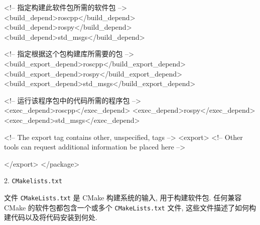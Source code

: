 \documentclass[openany, fontset=windowsold]{ctexbook}
\theoremstyle{kaiti}
\theoremstyle{normal}
\begin{document}
\begin{xml}
    <!-- 指定构建此软件包所需的软件包 -->
    <build_depend>roscpp</build_depend>
    <build_depend>rospy</build_depend>
    <build_depend>std_msgs</build_depend>

    <!-- 指定根据这个包构建库所需要的包 -->
    <build_export_depend>roscpp</build_export_depend>
    <build_export_depend>rospy</build_export_depend>
    <build_export_depend>std_msgs</build_export_depend>

    <!-- 运行该程序包中的代码所需的程序包 -->  
    <exec_depend>roscpp</exec_depend>
    <exec_depend>rospy</exec_depend>
    <exec_depend>std_msgs</exec_depend>


    <!-- The export tag contains other, unspecified, tags -->
    <export>
      <!-- Other tools can request additional information be placed here -->

    </export>
  </package>
\end{xml}

2. \verb|CMakelists.txt|

文件 \verb|CMakeLists.txt| 是 CMake 构建系统的输入, 用于构建软件包. 任何兼容 CMake 的软件包都包含一个或多个 \verb|CMakeLists.txt| 文件, 这些文件描述了如何构建代码以及将代码安装到何处.
\end{document}
